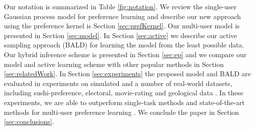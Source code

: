 Our notation is summarized in Table \ref{fig:notation}. We review the single-user Gaussian process model for preference learning and describe our new approach using the preference kernel is Section \ref{sec:prefKernel}.  Our multi-user model is presented in Section \ref{sec:model}. In Section \ref{sec:active} we describe our active sampling approach (BALD) for learning the model from the least possible data. Our hybrid inference scheme is presented in Section \ref{sec:ep} and we compare our model and active learning scheme with other popular methods in Section \ref{sec:relatedWork}. In Section \ref{sec:experiments} the proposed model and BALD are evaluated in experiments on simulated and a number of real-world datasets, including sushi-preference, electoral, movie-rating and geological data . In these experiments, we are able to outperform single-task methods \citep{chu2005} and state-of-the-art methods for multi-user preference learning \citep{birlutiu2009,Bonilla2010}. We conclude the paper in Section \ref{sec:conclusions}.

